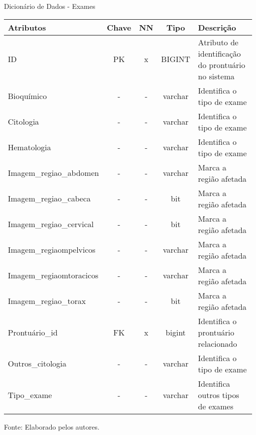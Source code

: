 \documentclass[
    12pt,               %
    openright,          %
    oneside,
    a4paper,            %
    BIBLATEX,           %
    TODO,               %
    english,            %
    brazil              %
    ]{ifsp-spo-inf-ctds}
\begin{document}
\begin{center}
                \begin{quadro}[H]

                  \caption{Dicionário de Dados - Exames}
                  \begin{tabulary}{1.0\textwidth}{|p{11em}|c|c|c|p{17em}|}
                  \hline
                  Atributos & Chave & NN & Tipo & Descrição\\
                  \hline
                  ID & PK & x & BIGINT & Atributo de identificação do prontuário no sistema\\
                  \hline
		  Bioquímico & - & - & varchar & Identifica o tipo de exame\\
		  \hline
		  Citologia & - & - & varchar & Identifica o tipo de exame \\
		  \hline
		  Hematologia & - & - & varchar & Identifica o tipo de exame\\
		  \hline  
                  Imagem\_regiao\_abdomen & - & - & varchar & Marca a região afetada\\
                  \hline
                  Imagem\_regiao\_cabeca & - & - & bit & Marca a região afetada\\
                  \hline
		  Imagem\_regiao\_cervical & - & - & bit & Marca a região afetada\\
                  \hline
                  Imagem\_regiaompelvicos & - & - & varchar & Marca a região afetada\\
                  \hline
                  Imagem\_regiaomtoracicos & - & - & varchar & Marca a região afetada\\
                  \hline
                  Imagem\_regiao\_torax & - & - & bit & Marca a região afetada\\
                  \hline
		  Prontuário\_id & FK & x & bigint & Identifica o prontuário relacionado \\
                  \hline 
		  Outros\_citologia & - & - & varchar & Identifica o tipo de exame\\
		  \hline
		  Tipo\_exame & - & - & varchar & Identifica outros tipos de exames\\
		  \hline  

                  \end{tabulary}
                  \label{qd: md-exame}
                  \centering
                  \footnotesize Fonte: Elaborado pelos autores.
                \end{quadro}
            \end{center} 
\end{document}
